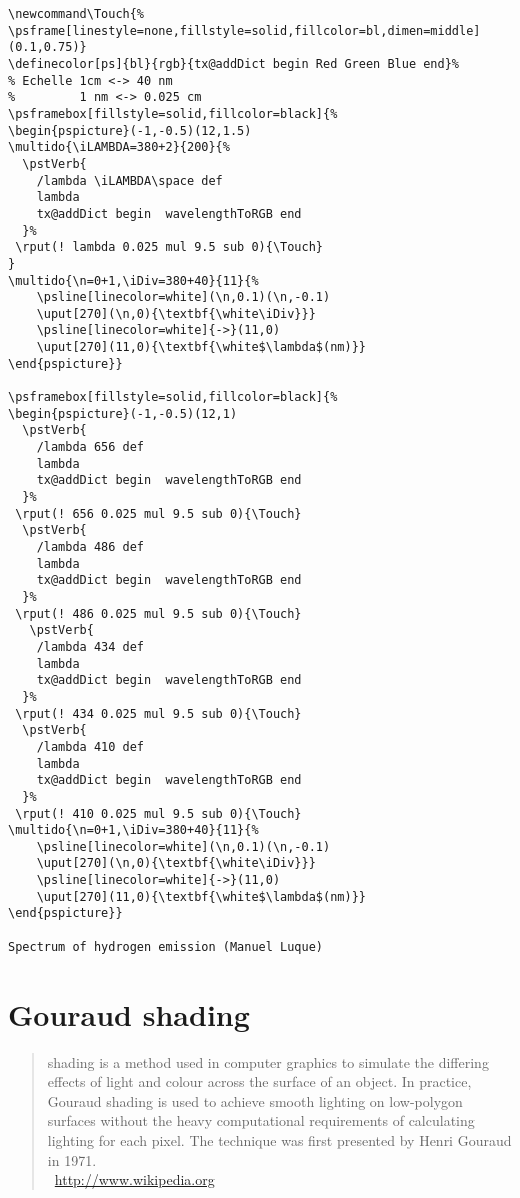 \documentclass[11pt,english,BCOR10mm,DIV12,bibliography=totoc,parskip=false,smallheadings
    headexclude,footexclude,oneside]{pst-doc}
\begin{document}
\begin{lstlisting}
\newcommand\Touch{%
\psframe[linestyle=none,fillstyle=solid,fillcolor=bl,dimen=middle](0.1,0.75)}
\definecolor[ps]{bl}{rgb}{tx@addDict begin Red Green Blue end}%
% Echelle 1cm <-> 40 nm
%         1 nm <-> 0.025 cm
\psframebox[fillstyle=solid,fillcolor=black]{%
\begin{pspicture}(-1,-0.5)(12,1.5)
\multido{\iLAMBDA=380+2}{200}{%
  \pstVerb{
    /lambda \iLAMBDA\space def
    lambda
    tx@addDict begin  wavelengthToRGB end
  }%
 \rput(! lambda 0.025 mul 9.5 sub 0){\Touch}
}
\multido{\n=0+1,\iDiv=380+40}{11}{%
    \psline[linecolor=white](\n,0.1)(\n,-0.1)
    \uput[270](\n,0){\textbf{\white\iDiv}}}
    \psline[linecolor=white]{->}(11,0)
    \uput[270](11,0){\textbf{\white$\lambda$(nm)}}
\end{pspicture}}

\psframebox[fillstyle=solid,fillcolor=black]{%
\begin{pspicture}(-1,-0.5)(12,1)
  \pstVerb{
    /lambda 656 def
    lambda
    tx@addDict begin  wavelengthToRGB end
  }%
 \rput(! 656 0.025 mul 9.5 sub 0){\Touch}
  \pstVerb{
    /lambda 486 def
    lambda
    tx@addDict begin  wavelengthToRGB end
  }%
 \rput(! 486 0.025 mul 9.5 sub 0){\Touch}
   \pstVerb{
    /lambda 434 def
    lambda
    tx@addDict begin  wavelengthToRGB end
  }%
 \rput(! 434 0.025 mul 9.5 sub 0){\Touch}
  \pstVerb{
    /lambda 410 def
    lambda
    tx@addDict begin  wavelengthToRGB end
  }%
 \rput(! 410 0.025 mul 9.5 sub 0){\Touch}
\multido{\n=0+1,\iDiv=380+40}{11}{%
    \psline[linecolor=white](\n,0.1)(\n,-0.1)
    \uput[270](\n,0){\textbf{\white\iDiv}}}
    \psline[linecolor=white]{->}(11,0)
    \uput[270](11,0){\textbf{\white$\lambda$(nm)}}
\end{pspicture}}

Spectrum of hydrogen emission (Manuel Luque)
\end{lstlisting}



\section{Gouraud shading}
\begin{quotation}
 shading is a method used in computer graphics to simulate the differing effects of
light and colour across the surface of an object. In practice, Gouraud shading is used to
achieve smooth lighting on low-polygon surfaces without the heavy computational requirements
of calculating lighting for each pixel. The technique was first presented by Henri Gouraud in 1971.\\
~\hfill{\small \url{http://www.wikipedia.org}}
\end{quotation}
\end{document}
